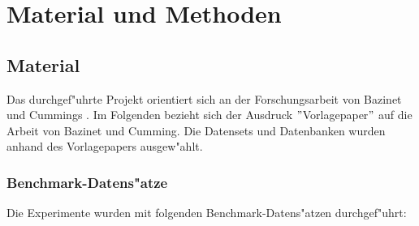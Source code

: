 \documentclass[10pt, a4paper]{report}[08.12.2015]
\begin{document}
    \newpage
  \chapter{Material und Methoden}
    
    \section{Material} 
    
      Das durchgef"uhrte Projekt orientiert sich an der Forschungsarbeit von
      Bazinet und Cummings \cite{bazinet2012}. Im 
      Folgenden bezieht sich der Ausdruck $"$Vorlagepaper$"$ auf die Arbeit von
      Bazinet und Cumming. Die Datensets und Datenbanken wurden anhand des 			  Vorlagepapers ausgew"ahlt.
      
      \subsection{Benchmark-Datens"atze}
      \label{subsec:Datens"atze}
        Die Experimente wurden mit folgenden Benchmark-Datens"atzen 					durchgef"uhrt:
        
\end{document}

